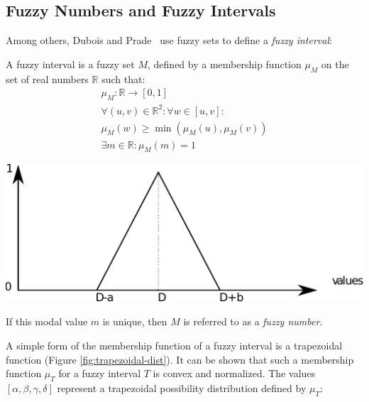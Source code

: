 \subsection{\label{subsec:fuzzy-numbers}Fuzzy Numbers and Fuzzy Intervals}
Among others, Dubois and Prade~\cite{Dubois1983} use fuzzy sets \cite{Zadeh1965} to define a \emph{fuzzy interval}:
\begin{definition}
A fuzzy interval is a fuzzy set $M$, defined by a membership function $\mu_{M}$ on the set of real numbers $\mathbb{R}$ such that:
\begin{eqnarray}
\mu_{M} :  \mathbb{R} \rightarrow \left[0,1\right]  \\ 
\nonumber
\forall (u,v)\in\mathbb{R}^2: \forall w \in [u,v]:\\
\nonumber
\mu_M(w) \geq\min(\mu_M(u),\mu_M(v))  \\
\nonumber
\exists m \in \mathbb{R} :  \mu_M(m)=1 
\end{eqnarray}
\end{definition}

\begin{samepage}
\vspace*{13pt}
\begin{center}
{
\includegraphics[scale=0.25]{./graphs/triangular.pdf}

}
\end{center}
\vspace*{10pt}
\vspace*{13pt}
\end{samepage}
If this modal value $m$ is unique, then $M$ is referred to as a \emph{fuzzy number}. 

A simple form of the membership function of a fuzzy interval is a trapezoidal function (Figure \ref{fig:trapezoidal-dist}). It can be shown that such a membership function $\mu_T$ for a fuzzy interval $T$ is convex and normalized. The values $\left[\alpha, \beta, \gamma, \delta\right]$ represent a trapezoidal possibility distribution defined by $\mu_T$:

